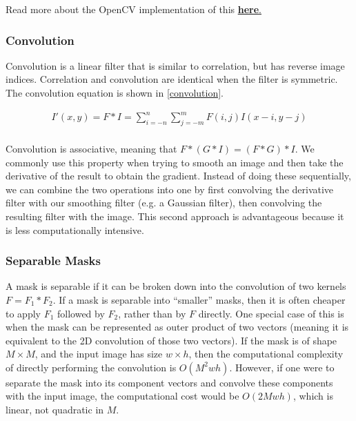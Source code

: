 \documentclass[twoside]{article}
\begin{document}
Read more about the OpenCV implementation of this  \href{https://docs.opencv.org/3.1.0/d4/d86/group__imgproc__filter.html#gaabe8c836e97159a9193fb0b11ac52cf1}{\textbf{here}.} 

\subsubsection{Convolution}
Convolution is a linear filter that is similar to correlation, but has reverse image indices. Correlation and convolution are identical when the filter is symmetric. The convolution equation is shown in \ref{convolution}.

\begin{equation}
  \label{convolution}
  \begin{aligned}
    I'(x,y) = F * I = \sum_{i=-n}^n \sum_{j=-m}^m F(i,j)I(x-i,y-j)\\
  \end{aligned}
\end{equation}

Convolution is associative, meaning that $F*(G*I) = (F*G)*I$. We commonly use this property when trying to smooth an image and then take the derivative of the result to obtain the gradient. Instead of doing these sequentially, we can combine the two operations into one by first convolving the derivative filter with our smoothing filter (e.g. a Gaussian filter), then convolving the resulting filter with the image. This second approach is advantageous because it is less computationally intensive.




\subsubsection{Separable Masks}
A mask is separable if it can be broken down into the convolution of two kernels $F = F_1 * F_2$. If a mask is separable into ``smaller'' masks, then it is often cheaper to apply $F_1$ followed by $F_2$, rather than by $F$ directly. One special case of this is when the mask can be represented as outer product of two vectors (meaning it is equivalent to the 2D convolution of those two vectors). If the mask is of shape $M\times M$, and the input image has size $w\times h$, then the computational complexity of directly performing the convolution is $O(M^2wh)$. However, if one were to separate the mask into its component vectors and convolve these components with the input image, the computational cost would be $O(2Mwh)$, which is linear, not quadratic in $M$. 
\end{document}
